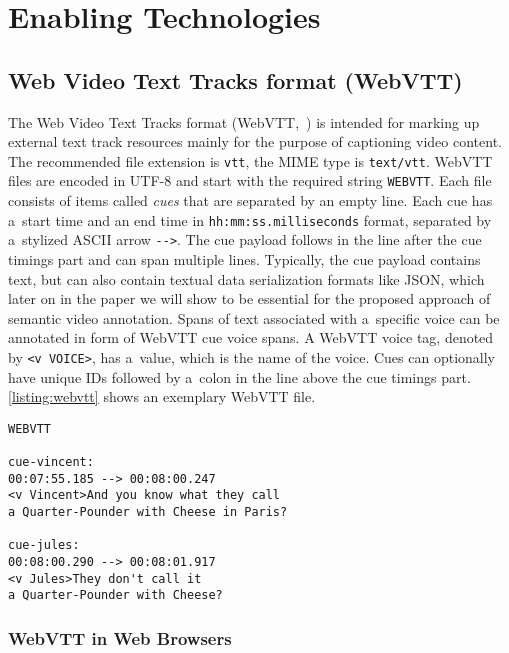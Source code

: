 \documentclass{sig-alternate}
\begin{document}
\section{Enabling Technologies}

\subsection{Web Video Text Tracks format (WebVTT)}

The Web Video Text Tracks format (WebVTT,~\cite{pfeiffer2013webvtt})
is intended for marking up external text track resources mainly
for the purpose of captioning video content.
The recommended file extension is \texttt{vtt},
the MIME type is \texttt{text/vtt}.
WebVTT files are encoded in UTF-8 and
start with the required string \texttt{WEBVTT}.
Each file consists of items called \emph{cues}
that are separated by an empty line.
Each cue has a~start time and an end time in
\texttt{hh:mm:ss.milliseconds} format,
separated by a~stylized ASCII arrow \texttt{-}\texttt{->}.
The cue payload follows in the line after the cue timings part
and can span multiple lines.
Typically, the cue payload contains text,
but can also contain textual data serialization formats like JSON,
which later on in the paper we will show to be essential
for the proposed approach of semantic video annotation.
Spans of text associated with a~specific voice can be annotated
in form of WebVTT cue voice spans.
A WebVTT voice tag, denoted by \texttt{<v VOICE>}, has a~value,
which is the name of the voice.
Cues can optionally have unique IDs
followed by a~colon in the line
above the cue timings part.
\autoref{listing:webvtt} shows an exemplary WebVTT file.

\begin{lstlisting}[caption={Sample WebVTT file with two cues
    with the IDs \texttt{cue-vincent} and
    \texttt{cue-jules} respectively},
  label=listing:webvtt, float=h!]
WEBVTT

cue-vincent:
00:07:55.185 --> 00:08:00.247
<v Vincent>And you know what they call
a Quarter-Pounder with Cheese in Paris?

cue-jules:
00:08:00.290 --> 00:08:01.917
<v Jules>They don't call it
a Quarter-Pounder with Cheese?
\end{lstlisting}

\subsubsection{WebVTT in Web Browsers}
\end{document}
